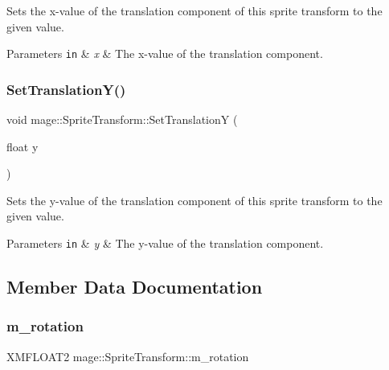 Sets the x-\/value of the translation component of this sprite transform to the given value.


\begin{DoxyParams}[1]{Parameters}
\mbox{\tt in}  & {\em x} & The x-\/value of the translation component. \\
\hline
\end{DoxyParams}
\hypertarget{structmage_1_1_sprite_transform_a52a07a3c3d9f65a33bc658208cd40444}{}\label{structmage_1_1_sprite_transform_a52a07a3c3d9f65a33bc658208cd40444} 
\subsubsection{\texorpdfstring{Set\+Translation\+Y()}{SetTranslationY()}}
{\footnotesize\ttfamily void mage\+::\+Sprite\+Transform\+::\+Set\+TranslationY (\begin{DoxyParamCaption}\item[{float}]{y }\end{DoxyParamCaption})}

Sets the y-\/value of the translation component of this sprite transform to the given value.


\begin{DoxyParams}[1]{Parameters}
\mbox{\tt in}  & {\em y} & The y-\/value of the translation component. \\
\hline
\end{DoxyParams}


\subsection{Member Data Documentation}
\hypertarget{structmage_1_1_sprite_transform_ae728a69c8b693c4129dbe93dec95687a}{}\label{structmage_1_1_sprite_transform_ae728a69c8b693c4129dbe93dec95687a} 
\subsubsection{\texorpdfstring{m\+\_\+rotation}{m\_rotation}}
{\footnotesize\ttfamily X\+M\+F\+L\+O\+A\+T2 mage\+::\+Sprite\+Transform\+::m\+\_\+rotation\hspace{0.3cm}{\ttfamily [private]}}

